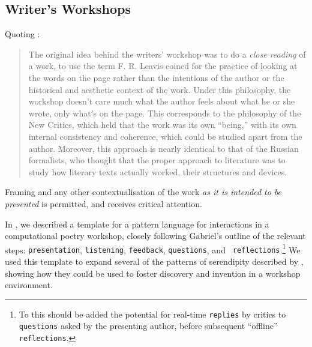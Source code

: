 \subsection{Writer's Workshops}

Quoting \cite[pp. 2--3]{gabriel2002writer}:

\begin{quote}
The original idea behind the writers' workshop was to do a \emph{close
  reading} of a work, to use the term F. R. Leavis coined for the
practice of looking at the words on the page rather than the
intentions of the author or the historical and aesthetic context of
the work.  Under this philosophy, the workshop doesn't care much what
the author feels about what he or she wrote, only what's on the page.
This corresponds to the philosophy of the New Critics, which held that
the work was its own ``being,'' with its own internal consistency and
coherence, which could be studied apart from the author.  Moreover,
this approach is nearly identical to that of the Russian formalists,
who thought that the proper approach to literature was to study how
literary texts actually worked, their structures and devices.
\end{quote}

Framing and any other contextualisation of the work \emph{as it is
  intended to be presented} is permitted, and receives critical attention.

In \cite{serendipity-arxiv}, we described a template for a pattern
language for interactions in a computational poetry workshop, closely
following Gabriel's outline of the relevant steps: {\tt presentation},
{\tt listening}, {\tt feedback}, {\tt questions}, and {\tt
  reflections}.\footnote{To this should be added the potential for
  real-time {\tt replies} by critics to {\tt questions} asked by the
  presenting author, before subsequent ``offline'' {\tt reflections}.}
We used this template to expand several of the patterns of serendipity
described by \cite{van1994anatomy}, showing how they could be used to
foster discovery and invention in a workshop environment.



